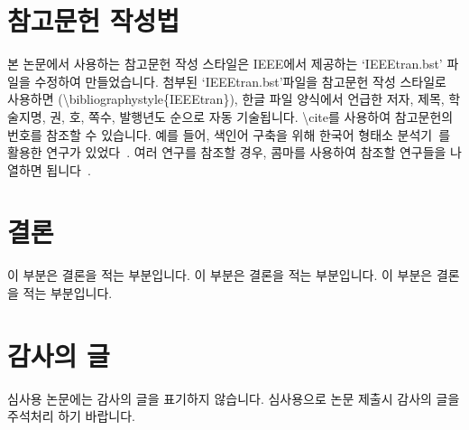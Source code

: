 \documentclass[twocolumn, 10pt]{article}
\begin{document}
\section{참고문헌 작성법}
본 논문에서 사용하는 참고문헌 작성 스타일은 IEEE에서 제공하는 `IEEEtran.bst' 파일을 수정하여 만들었습니다.
첨부된 `IEEEtran.bst'파일을 참고문헌 작성 스타일로 사용하면 (\textbackslash{bibliographystyle\{IEEEtran\}}), 
한글 파일 양식에서 언급한 저자, 제목, 학술지명, 권, 호, 쪽수, 발행년도 순으로 자동 기술됩니다.
\textbackslash{cite}를 사용하여 참고문헌의 번호를 참조할 수 있습니다. 
예를 들어, 색인어 구축을 위해 한국어 형태소 분석기~\cite{kang:hclt94}를 활용한 연구가 있었다~\cite{choi:jiise96}.
여러 연구를 참조할 경우, 콤마를 사용하여 참조할 연구들을 나열하면 됩니다~\cite{kang:BOOK2002,mani:BOOK1999,bengio:jmlr03,Burl:ECCV1998}.

\section{결론}
이 부분은 결론을 적는 부분입니다. 이 부분은 결론을 적는 부분입니다. 이 부분은 결론을 적는 부분입니다.

\section*{감사의 글}
심사용 논문에는 감사의 글을 표기하지 않습니다. 심사용으로 논문 제출시 감사의 글을 주석처리 하기 바랍니다.



\end{document}
